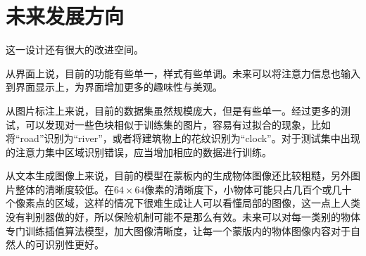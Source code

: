 \section{未来发展方向}
这一设计还有很大的改进空间。

从界面上说，目前的功能有些单一，样式有些单调。未来可以将注意力信息也输入到界面显示上，为界面增加更多的趣味性与美观。

从图片标注上来说，目前的数据集虽然规模庞大，但是有些单一。经过更多的测试，可以发现对一些色块相似于训练集的图片，容易有过拟合的现象，比如将“road”识别为“river”，或者将建筑物上的花纹识别为“clock”。对于测试集中出现的注意力集中区域识别错误，应当增加相应的数据进行训练。

从文本生成图像上来说，目前的模型在蒙板内的生成物体图像还比较粗糙，另外图片整体的清晰度较低。在$64 \times 64$像素的清晰度下，小物体可能只占几百个或几十个像素点的区域，这样的情况下很难生成让人可以看懂局部的图像，这一点上人类没有判别器做的好，所以保险机制可能不是那么有效。未来可以对每一类别的物体专门训练插值算法模型，加大图像清晰度，让每一个蒙版内的物体图像内容对于自然人的可识别性更好。




